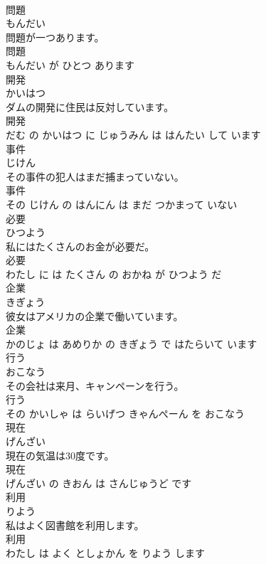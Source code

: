\documentclass[8pt]{extreport}
\begin{document}
\begin{CJK}{UTF8}{min}
\\	問題	
\\	もんだい			
\\	問題が一つあります。	
\\	問題 
\\	もんだい が ひとつ あります			
\\	開発	
\\	かいはつ			
\\	ダムの開発に住民は反対しています。	
\\	開発 
\\	だむ の かいはつ に じゅうみん は はんたい して います			
\\	事件	
\\	じけん			
\\	その事件の犯人はまだ捕まっていない。	
\\	事件 
\\	その じけん の はんにん は まだ つかまって いない			
\\	必要	
\\	ひつよう			
\\	私にはたくさんのお金が必要だ。	
\\	必要 
\\	わたし に は たくさん の おかね が ひつよう だ			
\\	企業	
\\	きぎょう			
\\	彼女はアメリカの企業で働いています。	
\\	企業 
\\	かのじょ は あめりか の きぎょう で はたらいて います			
\\	行う	
\\	おこなう			
\\	その会社は来月、キャンペーンを行う。	
\\	行う 
\\	その かいしゃ は らいげつ きゃんぺーん を おこなう			
\\	現在	
\\	げんざい			
\\	現在の気温は30度です。	
\\	現在 
\\	げんざい の きおん は さんじゅうど です			
\\	利用	
\\	りよう			
\\	私はよく図書館を利用します。	
\\	利用 
\\	わたし は よく としょかん を りよう します			

\end{CJK}
\end{document}
